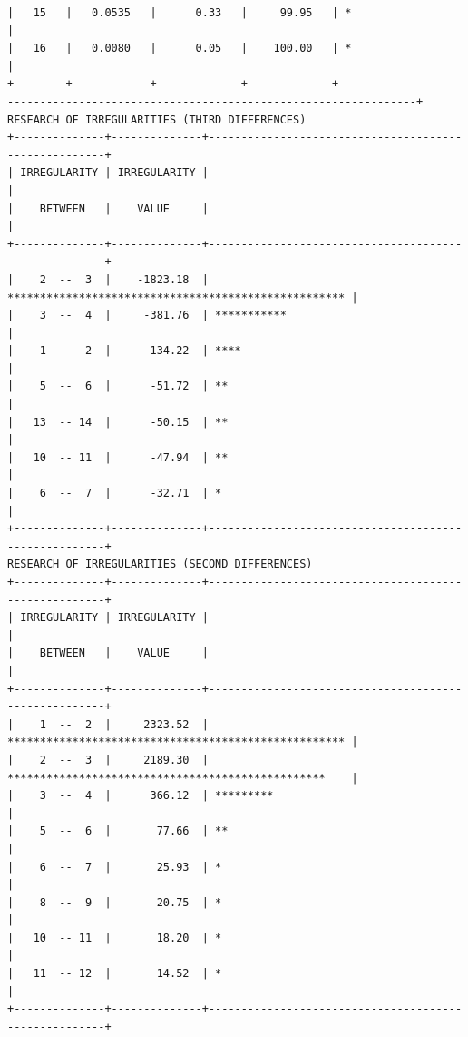 \documentclass[a4paper,10pt,twocolumn]{article}
\begin{document}
\begin{landscape}
\begin{verbatim}
|   15   |   0.0535   |      0.33   |     99.95   | *                                                                                |
|   16   |   0.0080   |      0.05   |    100.00   | *                                                                                |
+--------+------------+-------------+-------------+----------------------------------------------------------------------------------+
RESEARCH OF IRREGULARITIES (THIRD DIFFERENCES)
+--------------+--------------+------------------------------------------------------+
| IRREGULARITY | IRREGULARITY |                                                      |
|    BETWEEN   |    VALUE     |                                                      |
+--------------+--------------+------------------------------------------------------+
|    2  --  3  |    -1823.18  | **************************************************** |
|    3  --  4  |     -381.76  | ***********                                          |
|    1  --  2  |     -134.22  | ****                                                 |
|    5  --  6  |      -51.72  | **                                                   |
|   13  -- 14  |      -50.15  | **                                                   |
|   10  -- 11  |      -47.94  | **                                                   |
|    6  --  7  |      -32.71  | *                                                    |
+--------------+--------------+------------------------------------------------------+
RESEARCH OF IRREGULARITIES (SECOND DIFFERENCES)
+--------------+--------------+------------------------------------------------------+
| IRREGULARITY | IRREGULARITY |                                                      |
|    BETWEEN   |    VALUE     |                                                      |
+--------------+--------------+------------------------------------------------------+
|    1  --  2  |     2323.52  | **************************************************** |
|    2  --  3  |     2189.30  | *************************************************    |
|    3  --  4  |      366.12  | *********                                            |
|    5  --  6  |       77.66  | **                                                   |
|    6  --  7  |       25.93  | *                                                    |
|    8  --  9  |       20.75  | *                                                    |
|   10  -- 11  |       18.20  | *                                                    |
|   11  -- 12  |       14.52  | *                                                    |
+--------------+--------------+------------------------------------------------------+

\end{verbatim}
\end{landscape}
\end{document}
